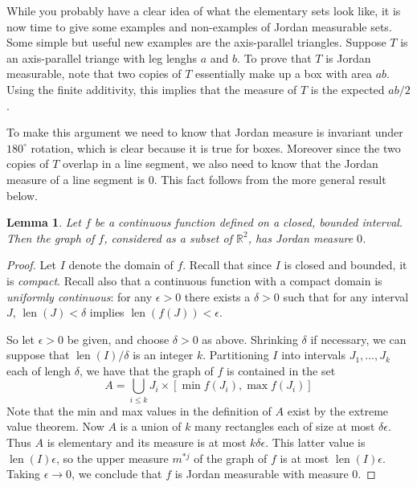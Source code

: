 \documentclass[11pt,oneside]{amsbook}
\newcommand{\RR}{{\mathbb R}}
\DeclareMathOperator{\len}{len}
\theoremstyle{definition}
\theoremstyle{plain}
\newtheorem{lem}[thm]{Lemma}
\theoremstyle{definition}
\theoremstyle{remark}
\numberwithin{equation}{section}
\numberwithin{figure}{section}
\begin{document}
While you probably have a clear idea of what the elementary sets look like, it is now time to give some examples and non-examples of Jordan measurable sets. Some simple but useful new examples are the axis-parallel triangles. Suppose $T$ is an axis-parallel triange with leg lenghs $a$ and $b$. To prove that $T$ is Jordan measurable, note that two copies of $T$ essentially make up a box with area $ab$. Using the finite additivity, this implies that the measure of $T$ is the expected $ab/2$.

To make this argument we need to know that Jordan measure is invariant under $180^\circ$ rotation, which is clear because it is true for boxes. Moreover since the two copies of $T$ overlap in a line segment, we also need to know that the Jordan measure of a line segment is $0$. This fact follows from the more general result below.


\begin{lem}
  \label{lem:jordan-graph}
  Let $f$ be a continuous function defined on a closed, bounded interval. Then the graph of $f$, considered as a subset of $\RR^2$, has Jordan measure $0$.
\end{lem}

\begin{proof}
  Let $I$ denote the domain of $f$. Recall that since $I$ is closed and bounded, it is \emph{compact}. Recall also that a continuous function with a compact domain is \emph{uniformly continuous}: for any $\epsilon>0$ there exists a $\delta>0$ such that for any interval $J$, $\len(J)<\delta$ implies $\len(f(J))<\epsilon$.

  So let $\epsilon>0$ be given, and choose $\delta>0$ as above. Shrinking $\delta$ if necessary, we can suppose that $\len(I)/\delta$ is an integer $k$. Partitioning $I$ into intervals $J_1,\ldots,J_k$ each of lengh $\delta$, we have that the graph of $f$ is contained in the set
  \[A=\bigcup_{i\leq k} J_i\times[\min f(J_i),\max f(J_i)]
  \]
  Note that the min and max values in the definition of $A$ exist by the extreme value theorem. Now $A$ is a union of $k$ many rectangles each of size at most $\delta\epsilon$. Thus $A$ is elementary and its measure is at most $k\delta\epsilon$. This latter value is $\len(I)\epsilon$, so the upper measure $m^{*j}$ of the graph of $f$ is at most $\len(I)\epsilon$. Taking $\epsilon\to0$, we conclude that $f$ is Jordan measurable with measure $0$.
\end{proof}
\end{document}
